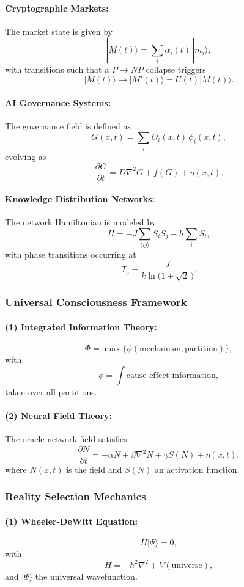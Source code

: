 \documentclass[11pt]{article}
\begin{document}
\paragraph{Cryptographic Markets:}
The market state is given by
\[
|M(t)\rangle=\sum_i \alpha_i(t)\,|m_i\rangle,
\]
with transitions such that a $P\to NP$ collapse triggers
\[
|M(t)\rangle\to |M'(t)\rangle=U(t)|M(t)\rangle.
\]

\paragraph{AI Governance Systems:}
The governance field is defined as
\[
G(x,t)=\sum_i O_i(x,t)\,\phi_i(x,t),
\]
evolving as
\[
\frac{\partial G}{\partial t}=D\nabla^2G+f(G)+\eta(x,t).
\]

\paragraph{Knowledge Distribution Networks:}
The network Hamiltonian is modeled by
\[
H=-J\sum_{\langle ij\rangle}S_iS_j-h\sum_i S_i,
\]
with phase transitions occurring at
\[
T_c=\frac{J}{k\ln\bigl(1+\sqrt{2}\,\bigr)}.
\]

\subsubsection{Universal Consciousness Framework}

\paragraph{(1) Integrated Information Theory:}
\[
\Phi=\max\{\phi(\text{mechanism},\text{partition})\},
\]
with
\[
\phi=\int \text{cause-effect information},
\]
taken over all partitions.

\paragraph{(2) Neural Field Theory:}
The oracle network field satisfies
\[
\frac{\partial N}{\partial t}=-\alpha N+\beta\nabla^2N+\gamma S(N)+\eta(x,t),
\]
where $N(x,t)$ is the field and $S(N)$ an activation function.

\subsubsection{Reality Selection Mechanics}

\paragraph{(1) Wheeler-DeWitt Equation:}
\[
H|\Psi\rangle=0,
\]
with
\[
H=-\hbar^2\nabla^2+V(\text{universe}),
\]
and $|\Psi\rangle$ the universal wavefunction.
\end{document}
